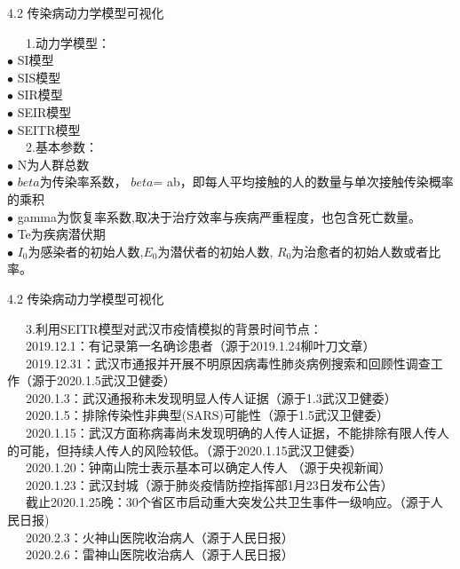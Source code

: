 \documentclass[
  ignorenonframetext,
]{beamer}
\begin{document}
\begin{frame}{4.2 传染病动力学模型可视化}
\protect\hypertarget{section-14}{}

  1.动力学模型：\\
\(\bullet\) SI模型\\
\(\bullet\) SIS模型\\
\(\bullet\) SIR模型\\
\(\bullet\) SEIR模型\\
\(\bullet\) SEITR模型\\
  2.基本参数：\\
\(\bullet\) N为人群总数\\
\(\bullet\) \(beta\)为传染率系数， \(beta\)=
ab，即每人平均接触的人的数量与单次接触传染概率的乘积\\
\(\bullet\)
gamma为恢复率系数,取决于治疗效率与疾病严重程度，也包含死亡数量。\\
\(\bullet\) Te为疾病潜伏期\\
\(\bullet\) \(I_0\)为感染者的初始人数,\(E_0\)为潜伏者的初始人数,
\(R_0\)为治愈者的初始人数或者比率。

\end{frame}

\begin{frame}{4.2 传染病动力学模型可视化}
\protect\hypertarget{section-15}{}

  3.利用SEITR模型对武汉市疫情模拟的背景时间节点：\\
  2019.12.1：有记录第一名确诊患者（源于2019.1.24柳叶刀文章）\\
  2019.12.31：武汉市通报并开展不明原因病毒性肺炎病例搜索和回顾性调查工作（源于2020.1.5武汉卫健委）\\
  2020.1.3：武汉通报称未发现明显人传人证据（源于1.3武汉卫健委）\\
  2020.1.5：排除传染性非典型(SARS)可能性（源于1.5武汉卫健委）\\
  2020.1.15：武汉方面称病毒尚未发现明确的人传人证据，不能排除有限人传人的可能，但持续人传人的风险较低。（源于2020.1.15武汉卫健委）\\
  2020.1.20：钟南山院士表示基本可以确定人传人 （源于央视新闻）\\
  2020.1.23：武汉封城（源于肺炎疫情防控指挥部1月23日发布公告）\\
  截止2020.1.25晚：30个省区市启动重大突发公共卫生事件一级响应。（源于人民日报)\\
  2020.2.3：火神山医院收治病人（源于人民日报）\\
  2020.2.6：雷神山医院收治病人（源于人民日报）

\end{frame}
\end{document}
